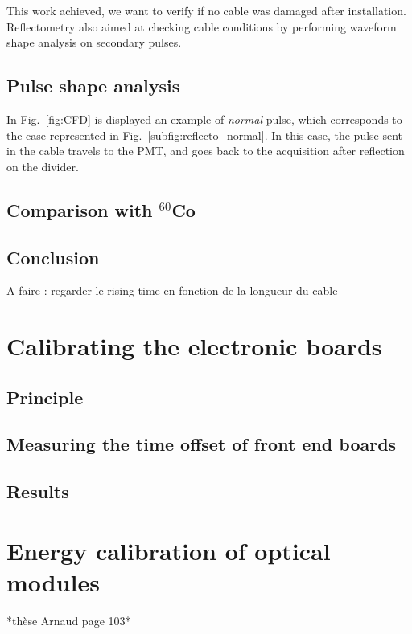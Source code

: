 This work achieved, we want to verify if no cable was damaged after installation.
Reflectometry also aimed at checking cable conditions by performing waveform shape analysis on secondary pulses.

\subsection{Pulse shape analysis}
\label{subsec:pulse_shape}
In Fig.~\ref{fig:CFD} is displayed an example of \emph{normal} pulse, which corresponds to the case represented in Fig.~\ref{subfig:reflecto_normal}.
In this case, the pulse sent in the cable travels to the PMT, and goes back to the acquisition after reflection on the divider.


\subsection{Comparison with $^{60}$Co}

\subsection{Conclusion}
A faire : regarder le rising time en fonction de la longueur du cable

\section{Calibrating the electronic boards}
\label{sec:TimeSynchroFEB}

\subsection{Principle}
\subsection{Measuring the time offset of front end boards}
\subsection{Results}


\section{Energy calibration of optical modules}
\label{sec:comm_energy_calibration}


*thèse Arnaud page 103*

